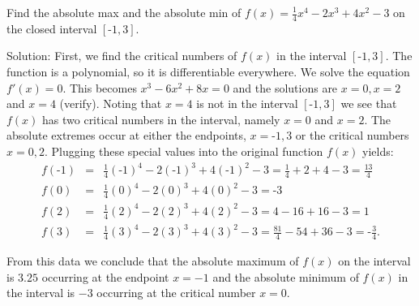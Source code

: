\documentclass{ximera}
\begin{document}
\begin{example}[example 3] Find the absolute max and the absolute min of $f(x) = \frac14 x^4 - 2x^3 + 4x^2 - 3$ on the 
closed interval $[\text{-}1, 3]$.


Solution:  First, we find the critical numbers of $f(x)$ in the interval $[\text{-}1, 3]$. 
The function is a polynomial, so it is differentiable everywhere.  
We solve the equation $f'(x) =0$.  This becomes $x^3 -6x^2 + 8x = 0$ and the solutions are $x=0, x=2$ and $x=4$ (verify). 
Noting that $x = 4$ is not in the interval $[\text{-}1,3]$ we see that 
$f(x)$ has two critical numbers in the interval, namely $x = 0$ and $x = 2$.
The absolute extremes occur at either the endpoints, $x=\text{-}1, 3$ or the critical numbers $x = 0,2$.  
Plugging these special values into the original function $f(x)$ yields:
\begin{eqnarray*}
f(\text{-}1) &=& \frac14(\text{-}1)^4 -2(\text{-}1)^3 + 4(\text{-}1)^2 - 3 = \frac14 + 2 + 4 - 3 = \frac{13}{4}\\
f(0) &=& \frac14 (0)^4 -2(0)^3 + 4(0)^2 - 3 = \text{-}3\\
f(2) &=& \frac14(2)^4 -2(2)^3 + 4(2)^2 - 3 = 4 -16 + 16 -3 = 1\\
f(3) &=& \frac14(3)^4 -2(3)^3 + 4(3)^2 - 3 = \frac{81}{4} - 54 + 36 - 3 = \text{-}\frac34.
\end{eqnarray*}


From this data we conclude that the absolute maximum of $f(x)$ on the interval is $3.25$ occurring 
at the endpoint $x = -1$ and the absolute minimum of $f(x)$ in the interval is $-3$
occurring at the critical number $x = 0$.
\begin{image}
\end{image}
\end{example}
\end{document}
